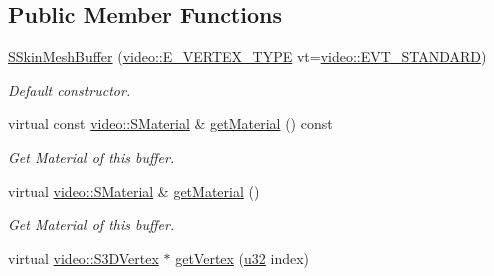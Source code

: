 \subsection*{Public Member Functions}
\begin{DoxyCompactItemize}
\item 
\mbox{\label{structirr_1_1scene_1_1SSkinMeshBuffer_aa80de8556499e8038b037ea39e702b93}} 
\hyperlink{structirr_1_1scene_1_1SSkinMeshBuffer_aa80de8556499e8038b037ea39e702b93}{S\+Skin\+Mesh\+Buffer} (\hyperlink{namespaceirr_1_1video_a0e3b59e025e0d0db0ed2ee0ce904deac}{video\+::\+E\+\_\+\+V\+E\+R\+T\+E\+X\+\_\+\+T\+Y\+PE} vt=\hyperlink{namespaceirr_1_1video_a0e3b59e025e0d0db0ed2ee0ce904deaca921f287a4f48d612a5be2d89453ca262}{video\+::\+E\+V\+T\+\_\+\+S\+T\+A\+N\+D\+A\+RD})
\begin{DoxyCompactList}\small\item\em Default constructor. \end{DoxyCompactList}\item 
\mbox{\label{structirr_1_1scene_1_1SSkinMeshBuffer_a0ba6d4da9bbb92c5aa9c7c70225d3eb6}} 
virtual const \hyperlink{classirr_1_1video_1_1SMaterial}{video\+::\+S\+Material} \& \hyperlink{structirr_1_1scene_1_1SSkinMeshBuffer_a0ba6d4da9bbb92c5aa9c7c70225d3eb6}{get\+Material} () const
\begin{DoxyCompactList}\small\item\em Get Material of this buffer. \end{DoxyCompactList}\item 
\mbox{\label{structirr_1_1scene_1_1SSkinMeshBuffer_a5e4a6cc69dac5ac75d43d8e89a23da2b}} 
virtual \hyperlink{classirr_1_1video_1_1SMaterial}{video\+::\+S\+Material} \& \hyperlink{structirr_1_1scene_1_1SSkinMeshBuffer_a5e4a6cc69dac5ac75d43d8e89a23da2b}{get\+Material} ()
\begin{DoxyCompactList}\small\item\em Get Material of this buffer. \end{DoxyCompactList}\item 
\mbox{\label{structirr_1_1scene_1_1SSkinMeshBuffer_a3773a0f0d5995080960d9d098f9f051e}} 
virtual \hyperlink{structirr_1_1video_1_1S3DVertex}{video\+::\+S3\+D\+Vertex} $\ast$ \hyperlink{structirr_1_1scene_1_1SSkinMeshBuffer_a3773a0f0d5995080960d9d098f9f051e}{get\+Vertex} (\hyperlink{namespaceirr_a0416a53257075833e7002efd0a18e804}{u32} index)

\end{DoxyCompactItemize}

